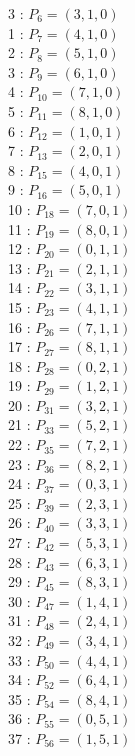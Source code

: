 \begin{multicols}{3}
 : $P_{6}=( 3, 1, 0 )$\\
1 : $P_{7}=( 4, 1, 0 )$\\
2 : $P_{8}=( 5, 1, 0 )$\\
3 : $P_{9}=( 6, 1, 0 )$\\
4 : $P_{10}=( 7, 1, 0 )$\\
5 : $P_{11}=( 8, 1, 0 )$\\
6 : $P_{12}=( 1, 0, 1 )$\\
7 : $P_{13}=( 2, 0, 1 )$\\
8 : $P_{15}=( 4, 0, 1 )$\\
9 : $P_{16}=( 5, 0, 1 )$\\
10 : $P_{18}=( 7, 0, 1 )$\\
11 : $P_{19}=( 8, 0, 1 )$\\
12 : $P_{20}=( 0, 1, 1 )$\\
13 : $P_{21}=( 2, 1, 1 )$\\
14 : $P_{22}=( 3, 1, 1 )$\\
15 : $P_{23}=( 4, 1, 1 )$\\
16 : $P_{26}=( 7, 1, 1 )$\\
17 : $P_{27}=( 8, 1, 1 )$\\
18 : $P_{28}=( 0, 2, 1 )$\\
19 : $P_{29}=( 1, 2, 1 )$\\
20 : $P_{31}=( 3, 2, 1 )$\\
21 : $P_{33}=( 5, 2, 1 )$\\
22 : $P_{35}=( 7, 2, 1 )$\\
23 : $P_{36}=( 8, 2, 1 )$\\
24 : $P_{37}=( 0, 3, 1 )$\\
25 : $P_{39}=( 2, 3, 1 )$\\
26 : $P_{40}=( 3, 3, 1 )$\\
27 : $P_{42}=( 5, 3, 1 )$\\
28 : $P_{43}=( 6, 3, 1 )$\\
29 : $P_{45}=( 8, 3, 1 )$\\
30 : $P_{47}=( 1, 4, 1 )$\\
31 : $P_{48}=( 2, 4, 1 )$\\
32 : $P_{49}=( 3, 4, 1 )$\\
33 : $P_{50}=( 4, 4, 1 )$\\
34 : $P_{52}=( 6, 4, 1 )$\\
35 : $P_{54}=( 8, 4, 1 )$\\
36 : $P_{55}=( 0, 5, 1 )$\\
37 : $P_{56}=( 1, 5, 1 )$\\

\end{multicols}

